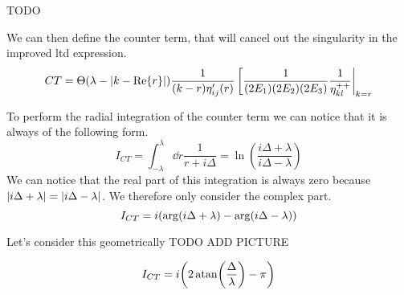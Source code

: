 TODO

We can then define the counter term, that will cancel out the singularity in the improved ltd expression.
\begin{equation}
    CT = \Theta(\lambda-\abs{k-\Re{r}}) \frac{1}{(k-r)\eta_{ij}'(r)}\eval[\frac{1}{(2E_1)(2E_2)(2E_3)} \frac{1}{\ELIPT{k}{l}}|_{k = r}
\end{equation}

To perform the radial integration of the counter term we can notice that it is always of the following form.
\begin{equation}
    I_{CT} = \int_{-\lambda}^{\lambda} \dd{r} \frac{1}{r+i\Delta} = \ln(\frac{i\Delta+\lambda}{i\Delta-\lambda})
\end{equation}
We can notice that the real part of this integration is always zero because $\abs{i\Delta+\lambda} = \abs{i\Delta-\lambda}$.
We therefore only consider the complex part.
\begin{equation}
    I_{CT} = i\qty(\arg(i\Delta + \lambda) - \arg(i\Delta - \lambda))
\end{equation}

Let's consider this geometrically
TODO ADD PICTURE

\begin{equation}
    I_{CT} = i\qty(2\atan(\frac{\Delta}{\lambda})-\pi)
\end{equation}
